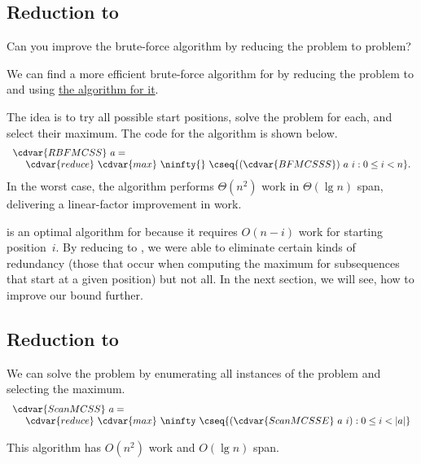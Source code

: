 \subsection{Reduction to \MCSSS{}}


\begin{teachask}
Can you improve the brute-force algorithm by reducing the \MCSS{}
problem to \MCSSS{} problem?
\end{teachask}
%

\begin{algorithm}
\label{alg:mcss::reduction::mcss-red-mcsss}

We can find a more efficient brute-force algorithm for \MCSS{} by
reducing the problem to \MCSSS{} and
using \href{alg:mcss::reduction::mcsss}{the algorithm for it}.

The idea is to try all possible start positions, solve the \MCSSS{}
problem for each, and select their maximum.
%
The code for the algorithm is shown below.
%
\[
\begin{array}{l}
\cdvar{RBFMCSS}~a = 
\\
~~~~\cdvar{reduce}~\cdvar{max}~\ninfty{}~\cseq{(\cdvar{BFMCSSS})~a~i : 0 \le i < n}.
\end{array}
\]
In the worst case, the algorithm performs $\Theta(n^2)$ work in
$\Theta(\lg{n})$ span, delivering a linear-factor improvement in
work.
\end{algorithm}
%

\begin{remark}
 is an optimal algorithm for \MCSSS{}
because it requires $O(n-i)$ work for starting position~$i$.
%
By reducing \MCSS{} to \MCSSS{}, we were able to eliminate certain
kinds of redundancy (those that occur when computing the maximum for
subsequences that start at a given position) but not all.
%
In the next section, we will see, how to improve our bound further.
\end{remark}

\subsection{Reduction to \MCSSE{}}

\begin{algorithm}
\label{alg:mcss::reduction:mcss-red-mcsse}

We can solve the \MCSS{} problem by enumerating all instances of
the \MCSSE{} problem and selecting the maximum.
%
\[
\begin{array}{l}
\cdvar{ScanMCSS}~a=
\\
~~~~\cdvar{reduce}~\cdvar{max}~\ninfty~\cseq{(\cdvar{ScanMCSSE}~a~i) : 0 \le i < |a|}
\end{array}
\]

This algorithm has $O(n^2)$ work and $O(\lg{n})$ span.

\end{algorithm}

